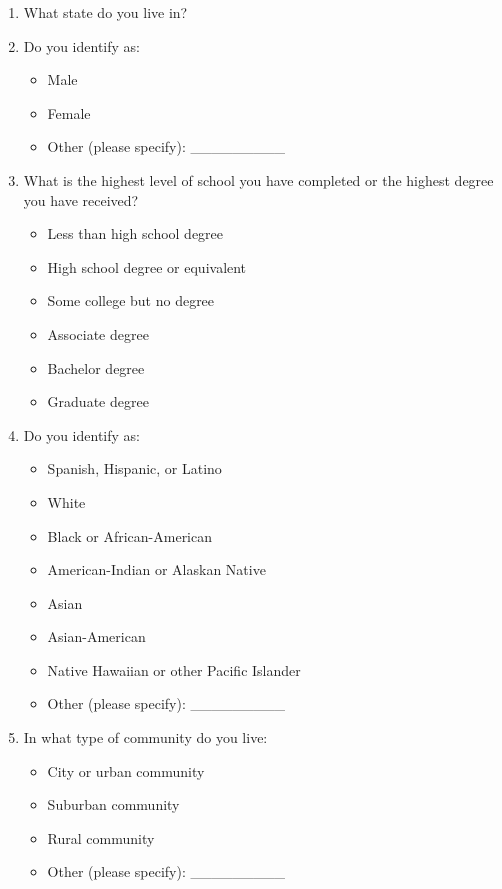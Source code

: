 \documentclass[letterpaper]{article} %
\begin{document}
\begin{enumerate}

\item What state do you live in?
\item Do you identify as:
\begin{itemize}
\item[$\ocircle$] Male
\item[$\ocircle$] Female
\item[$\ocircle$] Other (please specify): \_\_\_\_\_\_\_\_\_

\end{itemize}

\item What is the highest level of school you have completed or the highest degree you have received?
\begin{itemize}
\item[$\ocircle$] Less than high school degree
\item[$\ocircle$] High school degree or equivalent
\item[$\ocircle$] Some college but no degree
\item[$\ocircle$] Associate degree
\item[$\ocircle$] Bachelor degree
\item[$\ocircle$] Graduate degree
\end{itemize}

\item Do you identify as:
\begin{itemize}
\item[$\Box$] Spanish, Hispanic, or Latino
\item[$\Box$] White
\item[$\Box$] Black or African-American
\item[$\Box$] American-Indian or Alaskan Native
\item[$\Box$] Asian
\item[$\Box$] Asian-American
\item[$\Box$] Native Hawaiian or other Pacific Islander
\item[$\Box$] Other (please specify): \_\_\_\_\_\_\_\_\_
\end{itemize}

\item In what type of community do you live:
\begin{itemize}
\item[$\Box$] City or urban community
\item[$\Box$] Suburban community
\item[$\Box$] Rural community
\item[$\Box$] Other (please specify): \_\_\_\_\_\_\_\_\_
\end{itemize}


\end{enumerate}
\end{document}
